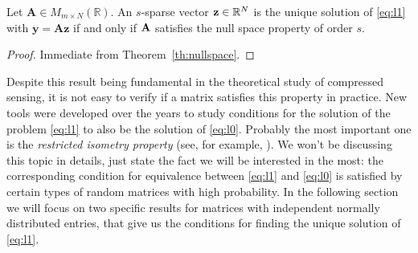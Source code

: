 \begin{theorem}
    Let $\mathbf{A} \in M_{m \times N}(\mathbb{R})$.
    An $s$-sparse vector $\mathbf{z} \in \mathbb{R}^N$ is the unique solution of \ref{eq:l1} with $\mathbf{y = Az}$ if and only
    if $\mathbf{A}$ satisfies the null space property of order $s$.
\end{theorem}
\begin{proof}
    Immediate from Theorem~\ref{th:nullspace}.
\end{proof}

Despite this result being fundamental in the theoretical study of compressed sensing, it is not easy to verify
if a matrix satisfies this property in practice.
New tools were developed over the years to study conditions for the solution of the problem \ref{eq:l1} to also be the solution of \ref{eq:l0}.
Probably the most important one is the \textit{restricted isometry property} (see, for example, \cite{tao}).
We won't be discussing this topic in details, just state the fact we will be interested in the most:
the corresponding condition for equivalence between \ref{eq:l1} and \ref{eq:l0} is satisfied by certain types of random matrices
with high probability.
In the following section we will focus on two specific results for matrices with independent normally distributed entries,
that give us the conditions for finding the unique solution of \ref{eq:l1}.

